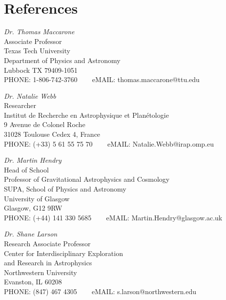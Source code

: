 \documentclass[letterpaper,10pt]{article}
\begin{document}
\pagebreak
\section*{References }  


   \begin{tabbing}
 \emph{Dr. Thomas Maccarone}\\
Associate Professor\\
Texas Tech University \\
Department of Physics and Astronomy \\
Lubbock TX 79409-1051 \\
PHONE:  1-806-742-3760 \,\,\,\,\,\,\,\,\, eMAIL: 
thomas.maccarone@ttu.edu
\end{tabbing}




   \begin{tabbing}
 \emph{Dr. Natalie Webb}\\
Researcher\\
Institut de Recherche en Astrophysique et Planétologie \\
9 Avenue de Colonel Roche \\
31028 Toulouse Cedex 4, France\\ 
PHONE:  (+33) 5 61 55 75 70  \,\,\,\,\,\,\,\,\, eMAIL: Natalie.Webb@irap.omp.eu
\end{tabbing}


\begin{tabbing}
 \emph{Dr. Martin Hendry}\\
Head of School\\
Professor of Gravitational Astrophysics and Cosmology \\
SUPA, School of Physics and Astronomy \\
University of Glasgow  \\
Glasgow, G12 9RW \\ 
PHONE:  (+44) 141 330 5685   \,\,\,\,\,\,\,\,\, eMAIL: Martin.Hendry@glasgow.ac.uk
\end{tabbing}


   \begin{tabbing}
 \emph{Dr. Shane Larson}\\
Research Associate Professor \\
Center for Interdisciplinary Exploration \\
and Research in Astrophysics \\
Northwestern University \\
Evanston, IL 60208  \\ 
PHONE:  (847) 467 4305   \,\,\,\,\,\,\,\,\, eMAIL: s.larson@northwestern.edu
\end{tabbing}
\end{document}
